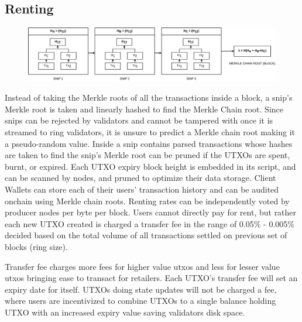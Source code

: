 \documentclass[a4paper,10pt]{article}
\begin{document}
\subsection{Renting}
\begin{figure}[h]
\begin{center}
\includegraphics[width=13cm]{merklechain}
\end{center}
\end{figure}
Instead of taking the Merkle roots of all the transactions inside a block, a snip's Merkle root is taken and linearly hashed to find the Merkle Chain root. Since snips can be rejected by validators and cannot be tampered with once it is streamed to ring validators, it is unsure to predict a Merkle chain root making it a pseudo-random value. Inside a snip contains parsed transactions whose hashes are taken to find the snip's Merkle root can be pruned if the UTXOs are spent, burnt, or expired. Each UTXO expiry block height is embedded in its script, and can be scanned by nodes, and pruned to optimize their data storage. Client Wallets can store each of their users' transaction history and can be audited onchain using Merkle chain roots. Renting rates can be independently voted by producer nodes per byte per block. Users cannot directly pay for rent, but rather each new UTXO created is charged a transfer fee in the range of 0.05\% - 0.005\% decided based on the total volume of all transactions settled on previous set of blocks (ring size).


 Transfer fee charges more fees for higher value utxos and less for lesser value utxos bringing ease to transact for retailers. Each UTXO's transfer fee will set an expiry date for itself. UTXOs doing state updates \cite{stateupdate} will not be charged a fee, where users are incentivized to combine UTXOs to a single balance holding UTXO with an increased expiry value saving validators disk space. 
\end{document}
